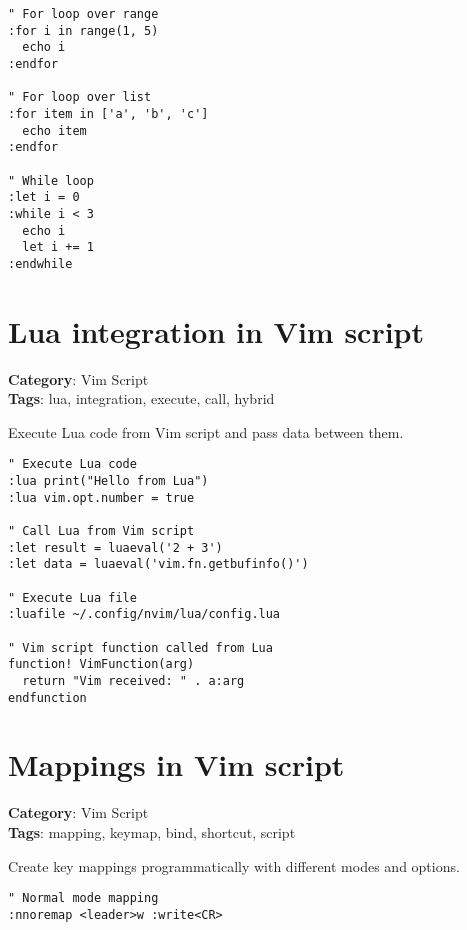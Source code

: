 {{{{{{{{{{{{{{{{{{{\begin{Exa*}{}
\begin{Verbatim}[fontsize=\footnotesize, breaklines, breakanywhere]
" For loop over range
:for i in range(1, 5)
  echo i
:endfor

" For loop over list
:for item in ['a', 'b', 'c']
  echo item
:endfor

" While loop
:let i = 0
:while i < 3
  echo i
  let i += 1
:endwhile
\end{Verbatim}
\end{Exa*}

\section{Lua integration in Vim script}

\textbf{Category}: Vim Script\\ \textbf{Tags}: lua, integration, execute, call, hybrid
\vspace{0.5cm}

Execute Lua code from Vim script and pass data between them.

\begin{Exa*}{}
\begin{Verbatim}[fontsize=\footnotesize, breaklines, breakanywhere]
" Execute Lua code
:lua print("Hello from Lua")
:lua vim.opt.number = true

" Call Lua from Vim script
:let result = luaeval('2 + 3')
:let data = luaeval('vim.fn.getbufinfo()')

" Execute Lua file
:luafile ~/.config/nvim/lua/config.lua

" Vim script function called from Lua
function! VimFunction(arg)
  return "Vim received: " . a:arg
endfunction
\end{Verbatim}
\end{Exa*}

\section{Mappings in Vim script}

\textbf{Category}: Vim Script\\ \textbf{Tags}: mapping, keymap, bind, shortcut, script
\vspace{0.5cm}

Create key mappings programmatically with different modes and options.

\begin{Exa*}{}
\begin{Verbatim}[fontsize=\footnotesize, breaklines, breakanywhere]
" Normal mode mapping
:nnoremap <leader>w :write<CR>


\end{Verbatim}
\end{Exa*}}}}}}}}}}}}}}}}}}}}
